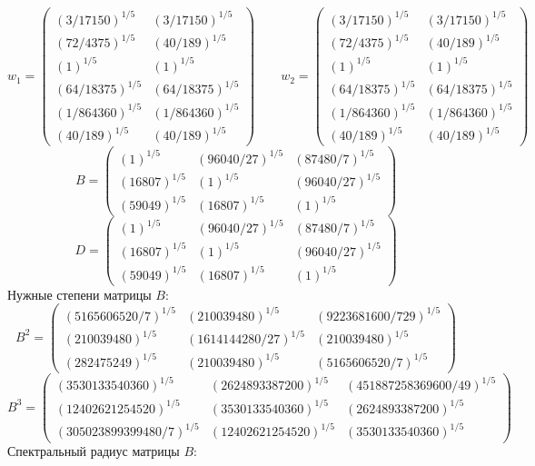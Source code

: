 $$w_1 = \begin{pmatrix}
(3/17150)^{1/5} & (3/17150)^{1/5}\\
(72/4375)^{1/5} & (40/189)^{1/5}\\
(1)^{1/5} & (1)^{1/5}\\
(64/18375)^{1/5} & (64/18375)^{1/5}\\
(1/864360)^{1/5} & (1/864360)^{1/5}\\
(40/189)^{1/5} & (40/189)^{1/5}
\end{pmatrix}
\qquad w_2 = \begin{pmatrix}
(3/17150)^{1/5} & (3/17150)^{1/5}\\
(72/4375)^{1/5} & (40/189)^{1/5}\\
(1)^{1/5} & (1)^{1/5}\\
(64/18375)^{1/5} & (64/18375)^{1/5}\\
(1/864360)^{1/5} & (1/864360)^{1/5}\\
(40/189)^{1/5} & (40/189)^{1/5}
\end{pmatrix}
$$
$$B = \begin{pmatrix}
(1)^{1/5} & (96040/27)^{1/5} & (87480/7)^{1/5}\\
(16807)^{1/5} & (1)^{1/5} & (96040/27)^{1/5}\\
(59049)^{1/5} & (16807)^{1/5} & (1)^{1/5}
\end{pmatrix}
$$
$$D = \begin{pmatrix}
(1)^{1/5} & (96040/27)^{1/5} & (87480/7)^{1/5}\\
(16807)^{1/5} & (1)^{1/5} & (96040/27)^{1/5}\\
(59049)^{1/5} & (16807)^{1/5} & (1)^{1/5}
\end{pmatrix}
$$
Нужные степени матрицы $B$:
$$B^2 = \begin{pmatrix}
(5165606520/7)^{1/5} & (210039480)^{1/5} & (9223681600/729)^{1/5}\\
(210039480)^{1/5} & (1614144280/27)^{1/5} & (210039480)^{1/5}\\
(282475249)^{1/5} & (210039480)^{1/5} & (5165606520/7)^{1/5}
\end{pmatrix}
$$
$$B^3 = \begin{pmatrix}
(3530133540360)^{1/5} & (2624893387200)^{1/5} & (451887258369600/49)^{1/5}\\
(12402621254520)^{1/5} & (3530133540360)^{1/5} & (2624893387200)^{1/5}\\
(305023899399480/7)^{1/5} & (12402621254520)^{1/5} & (3530133540360)^{1/5}
\end{pmatrix}
$$
Спектральный радиус матрицы $B$:
